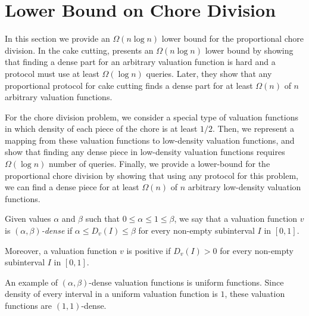 \section{Lower Bound on Chore Division}
In this section we provide an $\Omega(n \log n)$ lower bound for the proportional chore division. In the cake cutting,  presents an $\Omega(n \log n)$ lower bound by showing that finding a dense part for an arbitrary valuation function is hard and a protocol must use at least $\Omega( \log n)$ queries. Later, they show that any proportional protocol for cake cutting finds a dense part for at least $\Omega(n)$ of $n$ arbitrary valuation functions.


For the chore division problem, we consider a special type of valuation functions in which density of each piece of the chore is at least $1/2$. Then, we represent a mapping from these valuation functions to low-density valuation functions, and show that finding any dense piece in low-density valuation functions requires $\Omega( \log n)$ number of queries. Finally, we provide a lower-bound for the proportional chore division by showing that using any protocol for this problem, we can find a dense piece for at least $\Omega(n)$ of $n$ arbitrary low-density valuation functions.

\begin{definition}
Given values $\alpha$ and $\beta$ such that $0 \le \alpha \le 1 \le \beta$, we say that a valuation function $v$ is \textit{$(\alpha,\beta)$-dense} if $\alpha \le D_v(I) \le \beta$ for every non-empty subinterval $I$ in $[0,1]$.

Moreover, a valuation function $v$ is positive if $D_v(I) >0$ for every non-empty subinterval $I$ in $[0,1]$.
\end{definition}
An example of $(\alpha,\beta)$-dense valuation functions is uniform functions. Since density of every interval in a uniform valuation function is $1$, these valuation functions are $(1,1)$-dense. 
 

